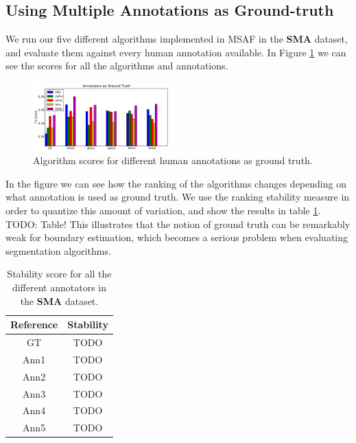 \documentclass{article}
\begin{document}

\subsection{Using Multiple Annotations as Ground-truth}

We run our five different algorithms implemented in MSAF in the \textbf{SMA} dataset, and evaluate them against every human annotation available.
In Figure \ref{fig:annotatorsAsGT} we can see the scores for all the algorithms and annotations.

\begin{figure}
  \centering
  \includegraphics[width=0.47\textwidth]{plots/AnnotatorsAsGT.pdf}
  \caption{Algorithm scores for different human annotations as ground truth.}
  \label{fig:annotatorsAsGT}
\end{figure}%

In the figure we can see how the ranking of the algorithms changes depending on what annotation is used as ground truth.
We use the ranking stability measure in order to quantize this amount of variation, and show the results in table \ref{tab:stability-multipleGT}.
TODO: Table!
This illustrates that the notion of ground truth can be remarkably weak for boundary estimation, which becomes a serious problem when evaluating segmentation algorithms.

\begin{table}[h]
  \center
  \begin{tabular}{|c|c|}
    \hline
    Reference & Stability \\
    \hline
    GT      & TODO \\
    Ann1    & TODO \\
    Ann2    & TODO \\
    Ann3    & TODO \\
    Ann4    & TODO \\
    Ann5    & TODO \\
    \hline
  \end{tabular}
  \caption{Stability score for all the different annotators in the \textbf{SMA} dataset.}
  \label{tab:stability-multipleGT}
\end{table}
\end{document}

